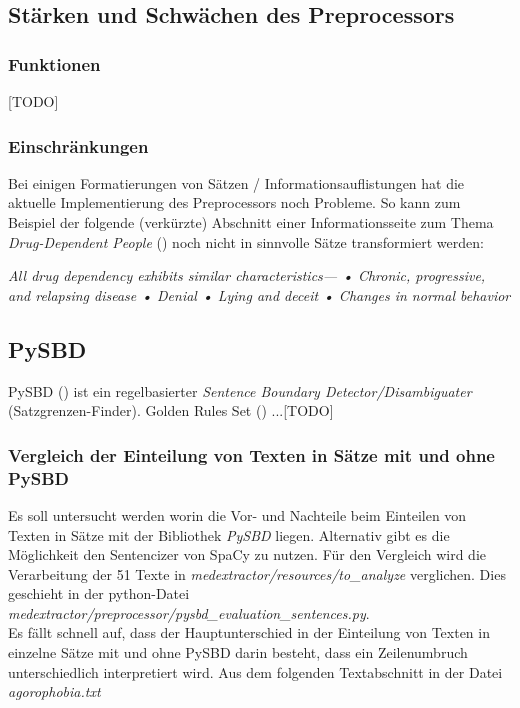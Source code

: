 \subsection{Stärken und Schwächen des Preprocessors}
\label{sec:evaluation_preprocessor}
\subsubsection{Funktionen}
[TODO]

\subsubsection{Einschränkungen} 
Bei einigen Formatierungen von Sätzen / Informationsauflistungen hat die aktuelle Implementierung des Preprocessors noch Probleme.
So kann zum Beispiel der folgende (verkürzte) Abschnitt einer Informationsseite zum Thema \emph{Drug-Dependent People} (\cite{drug_dependent_people}) noch nicht in sinnvolle Sätze transformiert werden:\\
\begin{addmargin}{10pt}
	\emph{
		All drug dependency exhibits similar characteristics— • Chronic, progressive, and relapsing disease • Denial • Lying and deceit • Changes in normal behavior
	}
\end{addmargin}
\vspace*{5mm}

\subsection{PySBD}
\label{evaluation_pysbd}
PySBD (\cite{sadvilkar_pysbd_2020}) ist ein regelbasierter \emph{Sentence Boundary Detector/Disambiguater} (Satzgrenzen-Finder). Golden Rules Set (\cite{golden_rules}) ...[TODO]

\subsubsection{Vergleich der Einteilung von Texten in Sätze mit und ohne PySBD}
Es soll untersucht werden worin die Vor- und Nachteile beim Einteilen von Texten in Sätze mit der Bibliothek \emph{PySBD} liegen. 
Alternativ gibt es die Möglichkeit den Sentencizer von SpaCy zu nutzen. Für den Vergleich wird die Verarbeitung der 51 Texte in 
\emph{medextractor/resources/to\_analyze} verglichen. Dies geschieht in der python-Datei \emph{medextractor/preprocessor/pysbd\_evaluation\_sentences.py}.\\

Es fällt schnell auf, dass der Hauptunterschied in der Einteilung von Texten in einzelne Sätze mit und ohne PySBD darin besteht, 
dass ein Zeilenumbruch unterschiedlich interpretiert wird.
Aus dem folgenden Textabschnitt in der Datei \emph{agorophobia.txt}\\

